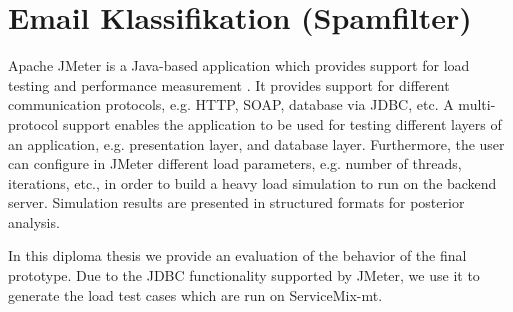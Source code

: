 \section{Email Klassifikation (Spamfilter)}
\label{sec:EmailKlassifikation}  

Apache JMeter is a Java-based application which provides support for load testing and performance measurement \cite{jmeter2013}. It provides support for different communication protocols, e.g. \ac{HTTP}, \ac{SOAP}, database via \ac{JDBC}, etc. A multi-protocol support enables the application to be used for testing different layers of an application, e.g. presentation layer, and database layer. Furthermore, the user can configure in JMeter different load parameters, e.g. number of threads, iterations, etc., in order to build a heavy load simulation to run on the backend server. Simulation results are presented in structured formats for posterior analysis. 

In this diploma thesis we provide an evaluation of the behavior of the final prototype. Due to the \ac{JDBC} functionality supported by JMeter, we use it to generate the load test cases which are run on ServiceMix-mt.

\FloatBarrier
